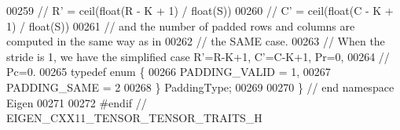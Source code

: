 \begin{DoxyCode}
00259 \textcolor{comment}{//   R' = ceil(float(R - K + 1) / float(S))}
00260 \textcolor{comment}{//   C' = ceil(float(C - K + 1) / float(S))}
00261 \textcolor{comment}{// and the number of padded rows and columns are computed in the same way as in}
00262 \textcolor{comment}{// the SAME case.}
00263 \textcolor{comment}{// When the stride is 1, we have the simplified case R'=R-K+1, C'=C-K+1, Pr=0,}
00264 \textcolor{comment}{// Pc=0.}
00265 \textcolor{keyword}{typedef} \textcolor{keyword}{enum} \{
00266   PADDING\_VALID = 1,
00267   PADDING\_SAME = 2
00268 \} PaddingType;
00269 
00270 \}  \textcolor{comment}{// end namespace Eigen}
00271 
00272 \textcolor{preprocessor}{#endif // EIGEN\_CXX11\_TENSOR\_TENSOR\_TRAITS\_H}
\end{DoxyCode}
